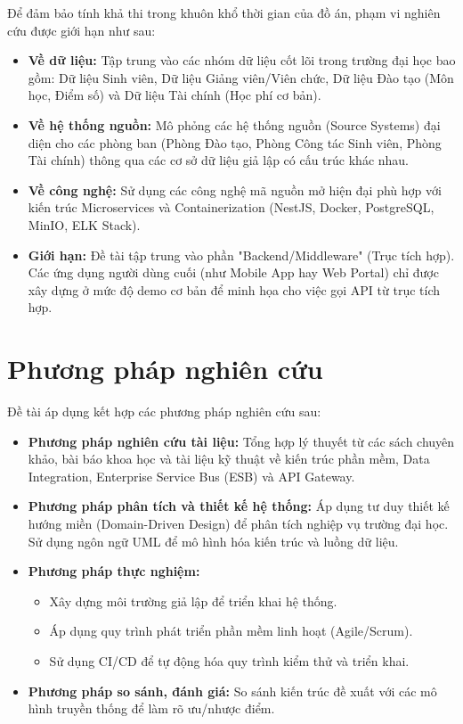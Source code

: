 Để đảm bảo tính khả thi trong khuôn khổ thời gian của đồ án, phạm vi nghiên cứu được giới hạn như sau:

\begin{itemize}
    \item \textbf{Về dữ liệu:} Tập trung vào các nhóm dữ liệu cốt lõi trong trường đại học bao gồm: Dữ liệu Sinh viên, Dữ liệu Giảng viên/Viên chức, Dữ liệu Đào tạo (Môn học, Điểm số) và Dữ liệu Tài chính (Học phí cơ bản).
    \item \textbf{Về hệ thống nguồn:} Mô phỏng các hệ thống nguồn (Source Systems) đại diện cho các phòng ban (Phòng Đào tạo, Phòng Công tác Sinh viên, Phòng Tài chính) thông qua các cơ sở dữ liệu giả lập có cấu trúc khác nhau.
    \item \textbf{Về công nghệ:} Sử dụng các công nghệ mã nguồn mở hiện đại phù hợp với kiến trúc Microservices và Containerization (NestJS, Docker, PostgreSQL, MinIO, ELK Stack).
    \item \textbf{Giới hạn:} Đề tài tập trung vào phần "Backend/Middleware" (Trục tích hợp). Các ứng dụng người dùng cuối (như Mobile App hay Web Portal) chỉ được xây dựng ở mức độ demo cơ bản để minh họa cho việc gọi API từ trục tích hợp.
\end{itemize}

\section{Phương pháp nghiên cứu}

Đề tài áp dụng kết hợp các phương pháp nghiên cứu sau:

\begin{itemize}
    \item \textbf{Phương pháp nghiên cứu tài liệu:} Tổng hợp lý thuyết từ các sách chuyên khảo, bài báo khoa học và tài liệu kỹ thuật về kiến trúc phần mềm, Data Integration, Enterprise Service Bus (ESB) và API Gateway.
    \item \textbf{Phương pháp phân tích và thiết kế hệ thống:} Áp dụng tư duy thiết kế hướng miền (Domain-Driven Design) để phân tích nghiệp vụ trường đại học. Sử dụng ngôn ngữ UML để mô hình hóa kiến trúc và luồng dữ liệu.
    \item \textbf{Phương pháp thực nghiệm:}
    \begin{itemize}
        \item Xây dựng môi trường giả lập để triển khai hệ thống.
        \item Áp dụng quy trình phát triển phần mềm linh hoạt (Agile/Scrum).
        \item Sử dụng CI/CD để tự động hóa quy trình kiểm thử và triển khai.
    \end{itemize}
    \item \textbf{Phương pháp so sánh, đánh giá:} So sánh kiến trúc đề xuất với các mô hình truyền thống để làm rõ ưu/nhược điểm.
\end{itemize}


